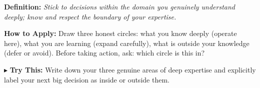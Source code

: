 \begin{tcolorbox}[title={\small \textbf{07 | Circle of Competence}},
  colback=blue!5!white, colframe=blue!40!black,
  fonttitle=\bfseries\small, boxrule=0.5pt]
\textbf{Definition:} \textit{Stick to decisions within the domain you genuinely understand deeply; know and respect the boundary of your expertise.}

\medskip
\textbf{How to Apply:} Draw three honest circles: what you know deeply (operate here), what you are learning (expand carefully), what is outside your knowledge (defer or avoid). Before taking action, ask: which circle is this in?

\medskip
$\blacktriangleright$ \textbf{Try This:} Write down your three genuine areas of deep expertise and explicitly label your next big decision as inside or outside them.
\end{tcolorbox} 

